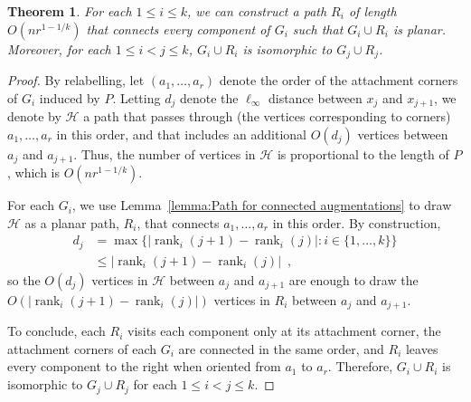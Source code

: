 \documentclass[11pt]{patmorin}
\newtheorem{theorem}{Theorem}[section]
\DeclareMathOperator{\rank}{rank}
\begin{document}
\begin{theorem}\label{theorem:main}
For each $1\leq i\leq k$, we can construct a path $R_i$ of length $O(nr^{1-1/k})$ that connects every component of $G_i$ such that $G_i\cup R_i$ is planar. Moreover, for each $1\leq i<j\leq k$, $G_i\cup R_i$ is isomorphic to $G_j\cup R_j$.
\end{theorem}
\begin{proof}
By relabelling, let $(a_1, \ldots, a_r)$ denote the order of the attachment corners of $G_i$ induced by $P$.  Letting $d_j$ denote the $\ell_\infty$ distance between $x_j$ and $x_{j+1}$, we denote by $\mathcal{H}$ a path that passes through (the vertices corresponding to corners) $a_1, \ldots, a_r$ in this order, and that includes an additional $O(d_j)$ vertices between $a_{j}$ and $a_{j+1}$.  Thus, the number of vertices in $\mathcal{H}$ is proportional to the length of $P$, which is $O(nr^{1-1/k})$.

For each $G_i$, we use Lemma~\ref{lemma:Path for connected augmentations}
to draw $\mathcal{H}$ as a planar path, $R_i$, that connects $a_1,
\ldots, a_r$ in this order. By construction, 
\begin{align*}
  d_j & = \max\{|\rank_i(j+1) - \rank_i(j)|: i\in\{1,\ldots,k\}\} \\
    & \le |\rank_i(j+1) - \rank_i(j)| \enspace ,
\end{align*}
so the $O(d_j)$ vertices in $\mathcal{H}$
between $a_j$ and $a_{j+1}$ are enough to draw the $O(|\rank_i(j+1) -
\rank_i(j)|)$ vertices in $R_i$ between $a_j$ and $a_{j+1}$.




To conclude, each $R_i$ visits each component only at its attachment corner, the attachment corners of each $G_i$ are connected in the same order, and $R_i$ leaves every component to the right when oriented from $a_1$ to $a_r$. Therefore, $G_i\cup R_i$ is isomorphic to $G_j\cup R_j$ for each $1\leq i<j\leq k$.
\end{proof}
\end{document}
